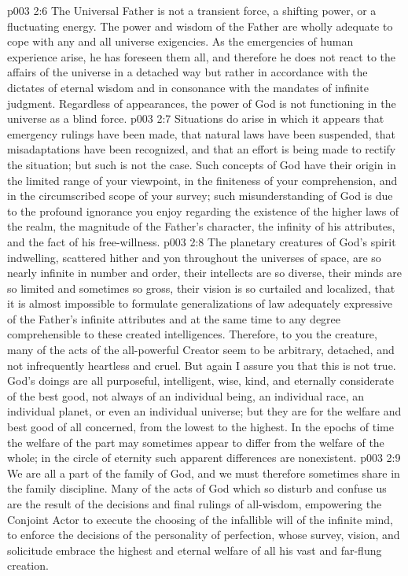 \pc \vs p003 2:6 The Universal Father is not a transient force, a shifting power, or a fluctuating energy. The power and wisdom of the Father are wholly adequate to cope with any and all universe exigencies. As the emergencies of human experience arise, he has foreseen them all, and therefore he does not react to the affairs of the universe in a detached way but rather in accordance with the dictates of eternal wisdom and in consonance with the mandates of infinite judgment. Regardless of appearances, the power of God is not functioning in the universe as a blind force.
\vs p003 2:7 Situations do arise in which it appears that emergency rulings have been made, that natural laws have been suspended, that misadaptations have been recognized, and that an effort is being made to rectify the situation; but such is not the case. Such concepts of God have their origin in the limited range of your viewpoint, in the finiteness of your comprehension, and in the circumscribed scope of your survey; such misunderstanding of God is due to the profound ignorance you enjoy regarding the existence of the higher laws of the realm, the magnitude of the Father’s character, the infinity of his attributes, and the fact of his free\hyp{}willness.
\vs p003 2:8 The planetary creatures of God’s spirit indwelling, scattered hither and yon throughout the universes of space, are so nearly infinite in number and order, their intellects are so diverse, their minds are so limited and sometimes so gross, their vision is so curtailed and localized, that it is almost impossible to formulate generalizations of law adequately expressive of the Father’s infinite attributes and at the same time to any degree comprehensible to these created intelligences. Therefore, to you the creature, many of the acts of the all\hyp{}powerful Creator seem to be arbitrary, detached, and not infrequently heartless and cruel. But again I assure you that this is not true. God’s doings are all purposeful, intelligent, wise, kind, and eternally considerate of the best good, not always of an individual being, an individual race, an individual planet, or even an individual universe; but they are for the welfare and best good of all concerned, from the lowest to the highest. In the epochs of time the welfare of the part may sometimes appear to differ from the welfare of the whole; in the circle of eternity such apparent differences are nonexistent.
\vs p003 2:9 We are all a part of the family of God, and we must therefore sometimes share in the family discipline. Many of the acts of God which so disturb and confuse us are the result of the decisions and final rulings of all\hyp{}wisdom, empowering the Conjoint Actor to execute the choosing of the infallible will of the infinite mind, to enforce the decisions of the personality of perfection, whose survey, vision, and solicitude embrace the highest and eternal welfare of all his vast and far\hyp{}flung creation.
